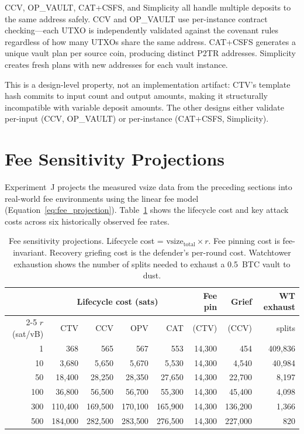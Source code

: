 CCV, OP\_VAULT, CAT+CSFS, and Simplicity all handle multiple deposits to the same
address safely. CCV and OP\_VAULT use per-instance contract checking---each UTXO is
independently validated against the covenant rules regardless of how many UTXOs share
the same address. CAT+CSFS generates a unique vault plan per source coin, producing
distinct P2TR addresses. Simplicity creates fresh plans with new addresses for each
vault instance.

This is a design-level property, not an implementation artifact: CTV's template hash
commits to input count and output amounts, making it structurally incompatible with
variable deposit amounts. The other designs either validate per-input (CCV, OP\_VAULT)
or per-instance (CAT+CSFS, Simplicity).

\section{Fee Sensitivity Projections} \label{se:fee_sensitivity_results}

Experiment~J projects the measured vsize data from the preceding sections into
real-world fee environments using the linear fee model
(Equation~\ref{eq:fee_projection}). Table~\ref{tab:fee_sensitivity} shows the
lifecycle cost and key attack costs across six historically observed fee rates.

\begin{table}[t]
\centering
\caption{Fee sensitivity projections. Lifecycle cost =
$\text{vsize}_{\text{total}} \times r$. Fee pinning cost is fee-invariant.
Recovery griefing cost is the defender's per-round cost. Watchtower exhaustion
shows the number of splits needed to exhaust a 0.5~BTC vault to dust.}
\label{tab:fee_sensitivity}
\footnotesize
\begin{tabular}{@{}rrrrrrrr@{}}
\toprule
& \multicolumn{4}{c}{Lifecycle cost (sats)} & Fee pin & Grief & WT exhaust \\
\cmidrule(lr){2-5}
$r$ (sat/vB) & CTV & CCV & OPV & CAT & (CTV) & (CCV) & splits \\
\midrule
1   &     368 &     565 &     567 &     553 & 14{,}300 &    454 & 409{,}836 \\
10  &   3{,}680 &   5{,}650 &   5{,}670 &   5{,}530 & 14{,}300 &  4{,}540 &  40{,}984 \\
50  &  18{,}400 &  28{,}250 &  28{,}350 &  27{,}650 & 14{,}300 & 22{,}700 &   8{,}197 \\
100 &  36{,}800 &  56{,}500 &  56{,}700 &  55{,}300 & 14{,}300 & 45{,}400 &   4{,}098 \\
300 & 110{,}400 & 169{,}500 & 170{,}100 & 165{,}900 & 14{,}300 & 136{,}200 &  1{,}366 \\
500 & 184{,}000 & 282{,}500 & 283{,}500 & 276{,}500 & 14{,}300 & 227{,}000 &    820 \\
\bottomrule
\end{tabular}
\end{table}

